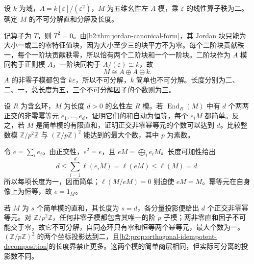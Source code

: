 \begin{exercise}\label{b2:ex:12-dual-numbers-decomposition}
	设 \(k\) 为域，\(A=k[\varepsilon]/(\varepsilon^2)\)，\(M\) 为五维幺性左 \(A\) 模，乘 \(\varepsilon\) 的线性算子秩为二。确定 \(M\) 的不可分解直和分解及长度。
\end{exercise}
\begin{solution}
	记算子为 \(T\)，则 \(T^2=0\)。由\cref{b2:thm:jordan-canonical-form}，其 Jordan 块只能为大小一或二的零特征值块，因为大小至少三的块平方不为零。每个二阶块贡献秩一，每个一阶块贡献秩零，所以恰有两个二阶块和一个一阶块。二阶块作为 \(A\) 模同构于正则模 \(A\)，一阶块同构于 \(A/(\varepsilon)\cong k\)，故
	\[
		M\cong A\oplus A\oplus k.
	\]
	\(A\) 的非零子模都包含 \(k\varepsilon\)，所以不可分解，\(k\) 简单也不可分解。长度分别为二、二、一，总长度为五，三个不可分解因子的个数则为三。
\end{solution}

\begin{exercise}\label{b2:ex:12-orthogonal-family-bound}
	设 \(R\) 为含幺环，\(M\) 为长度 \(d>0\) 的幺性左 \(R\) 模。若 \(\operatorname{End}_R(M)\) 中有 \(d\) 个两两正交的非零幂等元 \(e_1,\ldots,e_d\)，证明它们的和自动为恒等，每个 \(e_iM\) 都简单。反之，若 \(M\) 是简单模的有限直和，证明正交非零幂等元的个数可以达到 \(d\)。比较整数模 \(\mathbb Z/p^2\mathbb Z\) 与 \((\mathbb Z/p\mathbb Z)^2\) 能达到的最大个数，其中 \(p\) 为素数。
\end{exercise}
\begin{solution}
	令 \(e=\sum_i e_i\)。由正交性，\(e^2=e\)，且 \(eM=\bigoplus_i e_iM\)。长度可加性给出
	\[
		d\le\sum_{i=1}^d\ell(e_iM)=\ell(eM)\le\ell(M)=d.
	\]
	所以每项长度为一，因而简单；\(\ell(M/eM)=0\) 则迫使 \(eM=M\)。幂等元在自身像上为恒等，故 \(e=1_M\)。

	若 \(M\) 为 \(s\) 个简单模的直和，其长度为 \(s=d\)，各分量投影便给出 \(d\) 个正交非零幂等元。对 \(\mathbb Z/p^2\mathbb Z\)，任何非零子模都包含其唯一的阶 \(p\) 子模；两非零直和因子不可能交于零，故它不可分解，自同态环只有零和恒等两个幂等元，最大个数为一。\((\mathbb Z/p\mathbb Z)^2\) 的两个坐标投影达到二，且\cref{b2:prop:orthogonal-idempotent-decomposition}的长度界禁止更多。这两个模的简单商层相同，但实际可分离的投影数不同。
\end{solution}
